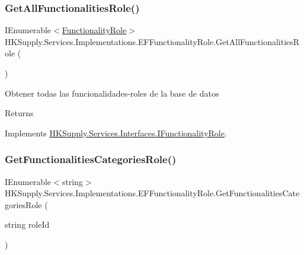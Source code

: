 \subsubsection{\texorpdfstring{Get\+All\+Functionalities\+Role()}{GetAllFunctionalitiesRole()}}
{\footnotesize\ttfamily I\+Enumerable$<$\hyperlink{class_h_k_supply_1_1_models_1_1_functionality_role}{Functionality\+Role}$>$ H\+K\+Supply.\+Services.\+Implementations.\+E\+F\+Functionality\+Role.\+Get\+All\+Functionalities\+Role (\begin{DoxyParamCaption}{ }\end{DoxyParamCaption})}



Obtener todas las funcionalidades-\/roles de la base de datos 

\begin{DoxyReturn}{Returns}

\end{DoxyReturn}


Implements \hyperlink{interface_h_k_supply_1_1_services_1_1_interfaces_1_1_i_functionality_role}{H\+K\+Supply.\+Services.\+Interfaces.\+I\+Functionality\+Role}.

\mbox{\label{class_h_k_supply_1_1_services_1_1_implementations_1_1_e_f_functionality_role_a1625ffb6313337132a446f831d357453}} 
\subsubsection{\texorpdfstring{Get\+Functionalities\+Categories\+Role()}{GetFunctionalitiesCategoriesRole()}}
{\footnotesize\ttfamily I\+Enumerable$<$string$>$ H\+K\+Supply.\+Services.\+Implementations.\+E\+F\+Functionality\+Role.\+Get\+Functionalities\+Categories\+Role (\begin{DoxyParamCaption}\item[{string}]{role\+Id }\end{DoxyParamCaption})}




